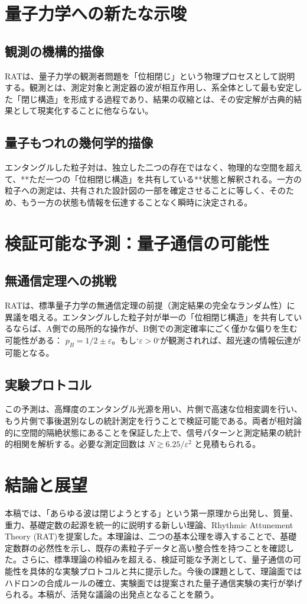 \documentclass[11pt,a4paper,ja=standard]{ltjarticle}
\begin{document}
\section{量子力学への新たな示唆}
\subsection{観測の機構的描像}
RATは、量子力学の観測者問題を「位相閉じ」という物理プロセスとして説明する。観測とは、測定対象と測定器の波が相互作用し、系全体として最も安定した「閉じ構造」を形成する過程であり、結果の収縮とは、その安定解が古典的結果として現実化することに他ならない。
\subsection{量子もつれの幾何学的描像}
エンタングルした粒子対は、独立した二つの存在ではなく、物理的な空間を超えて、**ただ一つの「位相閉じ構造」を共有している**状態と解釈される。一方の粒子への測定は、共有された設計図の一部を確定させることに等しく、そのため、もう一方の状態も情報を伝達することなく瞬時に決定される。

\section{検証可能な予測：量子通信の可能性}
\subsection{無通信定理への挑戦}
RATは、標準量子力学の無通信定理の前提（測定結果の完全なランダム性）に異議を唱える。エンタングルした粒子対が単一の「位相閉じ構造」を共有しているならば、A側での局所的な操作が、B側での測定確率にごく僅かな偏りを生む可能性がある： $p_B = 1/2 \pm \varepsilon$。もし`$\varepsilon > 0$`が観測されれば、超光速の情報伝達が可能となる。
\subsection{実験プロトコル}
この予測は、高輝度のエンタングル光源を用い、片側で高速な位相変調を行い、もう片側で事後選別なしの統計測定を行うことで検証可能である。両者が相対論的に空間的隔絶状態にあることを保証した上で、信号パターンと測定結果の統計的相関を解析する。必要な測定回数は $N \gtrsim 6.25 / \varepsilon^2$ と見積もられる。

\section{結論と展望}
本稿では、「あらゆる波は閉じようとする」という第一原理から出発し、質量、重力、基礎定数の起源を統一的に説明する新しい理論、Rhythmic Attunement Theory (RAT)を提案した。本理論は、二つの基本公理を導入することで、基礎定数群の必然性を示し、既存の素粒子データと高い整合性を持つことを確認した。さらに、標準理論の枠組みを超える、検証可能な予測として、量子通信の可能性を具体的な実験プロトコルと共に提示した。今後の課題として、理論面ではハドロンの合成ルールの確立、実験面では提案された量子通信実験の実行が挙げられる。本稿が、活発な議論の出発点となることを願う。
\end{document}
